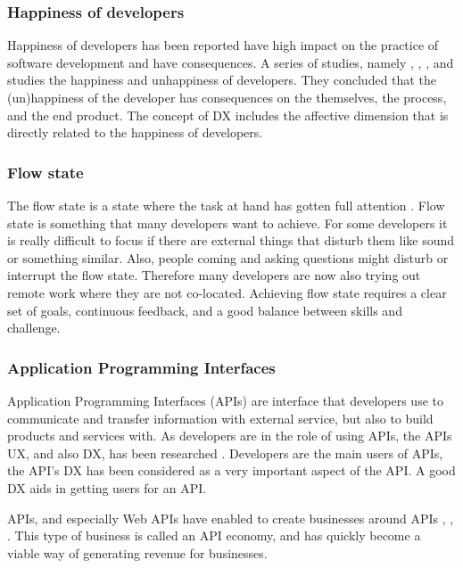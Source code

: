\documentclass[english, 12pt, a4paper, sci, utf8, a-1b, online]{aaltothesis}
\begin{document}
\subsubsection{Happiness of developers}

Happiness of developers has been reported have high impact on the practice of software development and have consequences. A series of studies, namely \textcite{unhappy-developers}, \textcite{on-the-unhappiness}, \textcite{consequences-of-unhappiness}, and \textcite{what-happens-when-unhappy} studies the happiness and unhappiness of developers. They concluded that the (un)happiness of the developer has consequences on the themselves, the process, and the end product. The concept of DX \parencite{fagerholm-dx-concept-and-definition} includes the affective dimension that is directly related to the happiness of developers.

\subsubsection{Flow state}

The flow state is a state where the task at hand has gotten full attention \parencite{flow-intrinsic-dx}. Flow state is something that many developers want to achieve. For some developers it is really difficult to focus if there are external things that disturb them like sound or something similar. Also, people coming and asking questions might disturb or interrupt the flow state. Therefore many developers are now also trying out remote work where they are not co-located. Achieving flow state requires a clear set of goals, continuous feedback, and a good balance between skills and challenge.

\subsubsection{Application Programming Interfaces}

Application Programming Interfaces (APIs) are interface that developers use to communicate and transfer information with external service, but also to build products and services with. As developers are in the role of using APIs, the APIs UX, and also DX, has been researched \parencite{api-designers}. Developers are the main users of APIs, the API's DX has been considered as a very important aspect of the API. A good DX aids in getting users for an API.

APIs, and especially Web APIs have enabled to create businesses around APIs \parencite{api-ecosystem}, \parencite{web-api-economy}, \parencite{moilanen2018api}. This type of business is called an API economy, and has quickly become a viable way of generating revenue for businesses.
\end{document}
